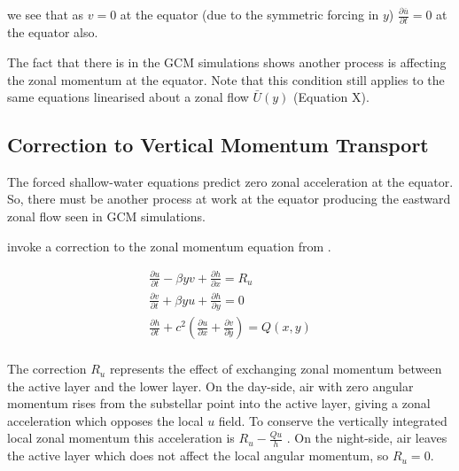 we see that as $v=0$ at the equator (due to the symmetric forcing in $y$) $\frac { \partial \overline { u } } { \partial t } = 0$ at the equator also.

The fact that there is in the GCM simulations shows another process is affecting the zonal momentum at the equator. Note that this condition still applies to the same equations linearised about a zonal flow $\bar{U}(y)$ (Equation X).




\subsection{Correction to Vertical Momentum Transport}

The forced shallow-water equations predict zero zonal acceleration at the equator. So, there must be another process at work at the equator producing the eastward zonal flow seen in GCM simulations.

\citet{showman2011superrotation} invoke a correction to the zonal momentum equation from \citet{shell2004superrotation}.

\begin{equation}\label{eqn:sw-eqns-R}
  \begin{gathered}
     \frac{\partial u}{\partial t} - \beta y v +\frac{\partial h}{\partial x} = R_{u} \\
      \frac{\partial v}{\partial t} + \beta y u + \frac{\partial h}{\partial y} = 0 \\
    \frac{\partial h}{\partial t} +c^{2}(\frac{\partial u}{\partial x} + \frac{\partial v}{\partial y}) = Q(x,y) \\
  \end{gathered}
\end{equation}

The correction $R_{u}$ represents the effect of exchanging zonal momentum between the active layer and the lower layer. On the day-side, air with zero angular momentum rises from the substellar point into the active layer, giving a zonal acceleration which opposes the local $u$ field. To conserve the vertically integrated local zonal momentum this acceleration is $R_{u} - \frac { Q u } { h }$ \citep{showman2011superrotation}. On the night-side, air leaves the active layer which does not affect the local angular momentum, so $R_{u}=0$.

